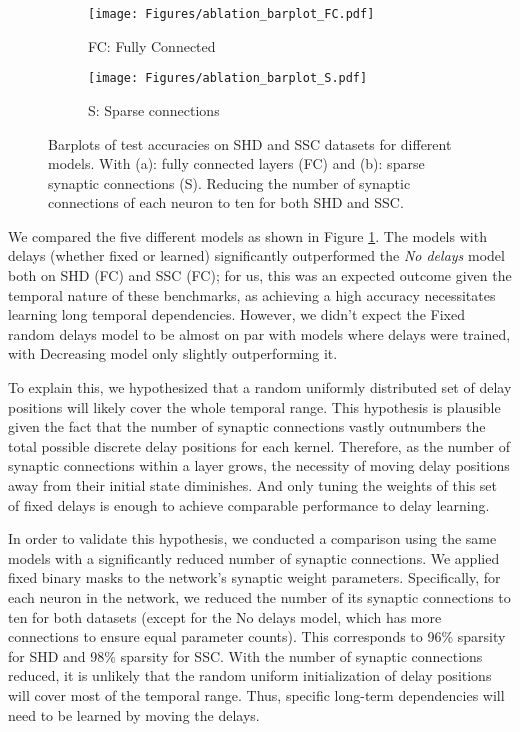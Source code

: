 \documentclass{article} \usepackage{iclr2024_conference,times}
\begin{document}
\begin{figure}[!ht]
  \centering
  \begin{subfigure}[b]{0.43\textwidth}
    \texttt{[image: Figures/ablation\_barplot\_FC.pdf]}
    \caption{FC: Fully Connected}
    \label{fig:fc}
  \end{subfigure}
\begin{subfigure}[b]{0.43\textwidth}
    \texttt{[image: Figures/ablation\_barplot\_S.pdf]}
    \caption{S: Sparse connections}
    \label{fig:S}
  \end{subfigure}
  \caption{Barplots of test accuracies on SHD and SSC datasets for different models. With (a): fully connected layers (FC) and (b): sparse synaptic connections (S). Reducing the number of synaptic connections of each neuron to ten for both SHD and SSC. }
  \label{fig:barplots}
\end{figure}

We compared the five different models as shown in Figure \ref{fig:fc}. The models with delays (whether fixed or learned) significantly outperformed the \textit{No delays} model both on SHD (FC) and SSC (FC); for us, this was an expected outcome given the temporal nature of these benchmarks, as achieving a high accuracy necessitates learning long temporal dependencies. However, we didn't expect the Fixed random delays model to be almost on par with models where delays were trained, with Decreasing  model only slightly outperforming it. 

To explain this, we hypothesized that a random uniformly distributed set of delay positions will likely cover the whole temporal range. This hypothesis is plausible given the fact that the number of synaptic connections vastly outnumbers the total possible discrete delay positions for each kernel. Therefore, as the number of synaptic connections within a layer grows, the necessity of moving delay positions away from their initial state diminishes. And only tuning the weights of this set of fixed delays is enough to achieve comparable performance to delay learning.

In order to validate this hypothesis, we conducted a comparison using the same models with a significantly reduced number of synaptic connections. We applied fixed binary masks to the network's synaptic weight parameters. Specifically, for each neuron in the network, we reduced the number of its synaptic connections to ten for both datasets (except for the No delays model, which has more connections to ensure equal parameter counts). This corresponds to 96\% sparsity for SHD and 98\% sparsity for SSC. 
With the number of synaptic connections reduced, it is unlikely that the random uniform initialization of delay positions will cover most of the temporal range. Thus, specific long-term dependencies will need to be learned by moving the delays. 
\end{document}
